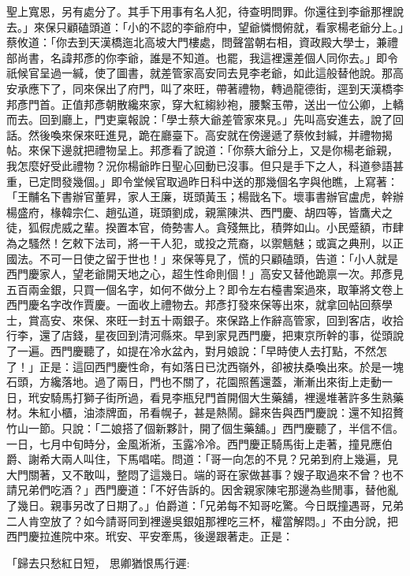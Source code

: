 聖上寬恩，另有處分了。其手下用事有名人犯，待查明問罪。你還往到李爺那裡說去。」來保只顧磕頭道：「小的不認的李爺府中，望爺憐憫俯就，看家楊老爺分上。」蔡攸道：「你去到天漢橋迤北高坡大門樓處，問聲當朝右相，資政殿大學士，兼禮部尚書，名諱邦彥的你李爺，誰是不知道。也罷，我這裡還差個人同你去。」即令祇候官呈過一緘，使了圖書，就差管家高安同去見李老爺，如此這般替他說。那高安承應下了，同來保出了府門，叫了來旺，帶著禮物，轉過龍德街，逕到天漢橋李邦彥門首。正值邦彥朝散纔來家，穿大紅縐紗袍，腰繫玉帶，送出一位公卿，上轎而去。回到廳上，門吏稟報說：「學士蔡大爺差管家來見。」先叫高安進去，說了回話。然後喚來保來旺進見，跪在廳臺下。高安就在傍邊遞了蔡攸封緘，并禮物揭帖。來保下邊就把禮物呈上。邦彥看了說道：「你蔡大爺分上，又是你楊老爺親，我怎麼好受此禮物？況你楊爺昨日聖心回動已沒事。但只是手下之人，科道參語甚重，已定問發幾個。」即令堂候官取過昨日科中送的那幾個名字與他瞧，上寫著：「王黼名下書辦官董昇，家人王廉，斑頭黃玉；楊戩名下。壞事書辦官盧虎，幹辦楊盛府，椽韓宗仁、趙弘道，斑頭劉成，親黨陳洪、西門慶、胡四等，皆鷹犬之徒，狐假虎威之輩。揆置本官，倚勢害人。貪殘無比，積弊如山。小民蹙額，巿肆為之騷然！乞敕下法司，將一干人犯，或投之荒裔，以禦魑魅；或寘之典刑，以正國法。不可一日使之留于世也！」來保等見了，慌的只顧磕頭，告道：「小人就是西門慶家人，望老爺開天地之心，超生性命則個！」高安又替他跪禀一次。邦彥見五百兩金銀，只買一個名字，如何不做分上？即令左右檯書案過來，取筆將文卷上西門慶名字改作賈慶。一面收上禮物去。邦彥打發來保等出來，就拿回帖回蔡學士，賞高安、來保、來旺一封五十兩銀子。來保路上作辭高管家，回到客店，收拾行李，還了店錢，星夜回到清河縣來。早到家見西門慶，把東京所幹的事，從頭說了一遍。西門慶聽了，如提在冷水盆內，對月娘說：「早時使人去打點，不然怎了！」正是：這回西門慶性命，有如落日已沈西嶺外，卻被扶桑喚出來。於是一塊石頭，方纔落地。過了兩日，門也不關了，花園照舊還蓋，漸漸出來街上走動一日，玳安騎馬打獅子街所過，看見李瓶兒門首開個大生藥舖，裡邊堆著許多生熟藥材。朱紅小櫃，油漆牌面，吊看幌子，甚是熱鬧。歸來告與西門慶說：還不知招贅竹山一節。只說：「二娘搭了個新夥計，開了個生藥舖。」西門慶聽了，半信不信。一日，七月中旬時分，金風淅淅，玉露冷冷。西門慶正騎馬街上走著，撞見應伯爵、謝希大兩人叫住，下馬唱喏。問道：「哥一向怎的不見？兄弟到府上幾遍，見大門關著，又不敢叫，整悶了這幾日。端的哥在家做甚事？嫂子取過來不曾？也不請兄弟們吃酒？」西門慶道：「不好告訴的。因舍親家陳宅那邊為些閒事，替他亂了幾日。親事另改了日期了。」伯爵道：「兄弟每不知哥吃驚。今日既撞遇哥，兄弟二人肯空放了？如今請哥同到裡邊吳銀姐那裡吃三杯，權當解悶。」不由分說，把西門慶拉進院中來。玳安、平安牽馬，後邊跟著走。正是：

「歸去只愁紅日短，  思卿猶恨馬行遲:

